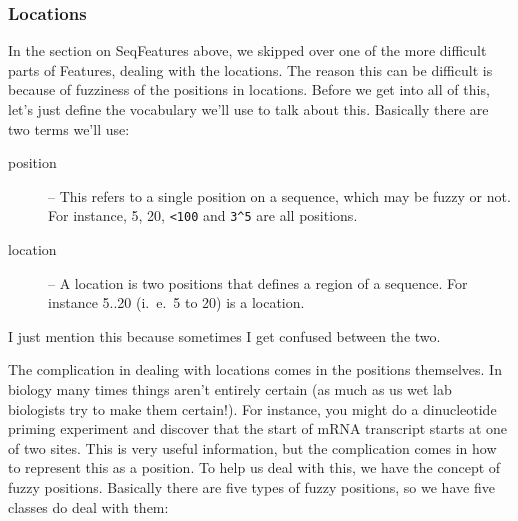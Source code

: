 \documentclass{report}
\begin{document}
\subsubsection{Locations}
\label{sec:locations}

In the section on SeqFeatures above, we skipped over one of the more difficult parts of Features, dealing with the locations. The reason this can be difficult is because of fuzziness of the positions in locations. Before we get into all of this, let's just define the vocabulary we'll use to talk about this. Basically there are two terms we'll use:

\begin{description}
  \item[position] -- This refers to a single position on a sequence, 
  which may be fuzzy or not. For instance, 5, 20, \verb|<100| and 
  \verb|3^5| are all positions.

  \item[location] -- A location is two positions that defines a region of a sequence. For instance 5..20 (i.~e.~5 to 20) is a location.
\end{description}

I just mention this because sometimes I get confused between the two.


The complication in dealing with locations comes in the positions themselves. In biology many times things aren't entirely certain (as much as us wet lab biologists try to make them certain!). For instance, you might do a dinucleotide priming experiment and discover that the start of mRNA transcript starts at one of two sites. This is very useful information, but the complication comes in how to represent this as a position. To help us deal with this, we have the concept of fuzzy positions. Basically there are five types of fuzzy positions, so we have five classes do deal with them:
\end{document}
